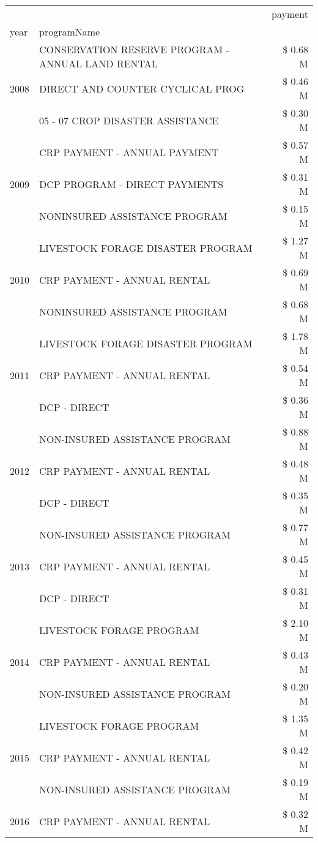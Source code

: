 \begin{tabular}{llr}
\toprule
 &  & payment \\
year & programName &  \\
\midrule
\multirow[t]{3}{*}{2008} & CONSERVATION RESERVE PROGRAM - ANNUAL LAND RENTAL & \$ 0.68 M \\
 & DIRECT AND COUNTER CYCLICAL PROG & \$ 0.46 M \\
 & 05 - 07 CROP DISASTER ASSISTANCE & \$ 0.30 M \\
\cline{1-3}
\multirow[t]{3}{*}{2009} & CRP PAYMENT - ANNUAL PAYMENT & \$ 0.57 M \\
 & DCP PROGRAM - DIRECT PAYMENTS & \$ 0.31 M \\
 & NONINSURED ASSISTANCE PROGRAM & \$ 0.15 M \\
\cline{1-3}
\multirow[t]{3}{*}{2010} & LIVESTOCK FORAGE DISASTER PROGRAM & \$ 1.27 M \\
 & CRP PAYMENT - ANNUAL RENTAL & \$ 0.69 M \\
 & NONINSURED ASSISTANCE PROGRAM & \$ 0.68 M \\
\cline{1-3}
\multirow[t]{3}{*}{2011} & LIVESTOCK FORAGE DISASTER PROGRAM & \$ 1.78 M \\
 & CRP PAYMENT - ANNUAL RENTAL & \$ 0.54 M \\
 & DCP - DIRECT & \$ 0.36 M \\
\cline{1-3}
\multirow[t]{3}{*}{2012} & NON-INSURED ASSISTANCE PROGRAM & \$ 0.88 M \\
 & CRP PAYMENT - ANNUAL RENTAL & \$ 0.48 M \\
 & DCP - DIRECT & \$ 0.35 M \\
\cline{1-3}
\multirow[t]{3}{*}{2013} & NON-INSURED ASSISTANCE PROGRAM & \$ 0.77 M \\
 & CRP PAYMENT - ANNUAL RENTAL & \$ 0.45 M \\
 & DCP - DIRECT & \$ 0.31 M \\
\cline{1-3}
\multirow[t]{3}{*}{2014} & LIVESTOCK FORAGE PROGRAM & \$ 2.10 M \\
 & CRP PAYMENT - ANNUAL RENTAL & \$ 0.43 M \\
 & NON-INSURED ASSISTANCE PROGRAM & \$ 0.20 M \\
\cline{1-3}
\multirow[t]{3}{*}{2015} & LIVESTOCK FORAGE PROGRAM & \$ 1.35 M \\
 & CRP PAYMENT - ANNUAL RENTAL & \$ 0.42 M \\
 & NON-INSURED ASSISTANCE PROGRAM & \$ 0.19 M \\
\cline{1-3}
\multirow[t]{3}{*}{2016} & CRP PAYMENT - ANNUAL RENTAL & \$ 0.32 M \\

\end{tabular}
